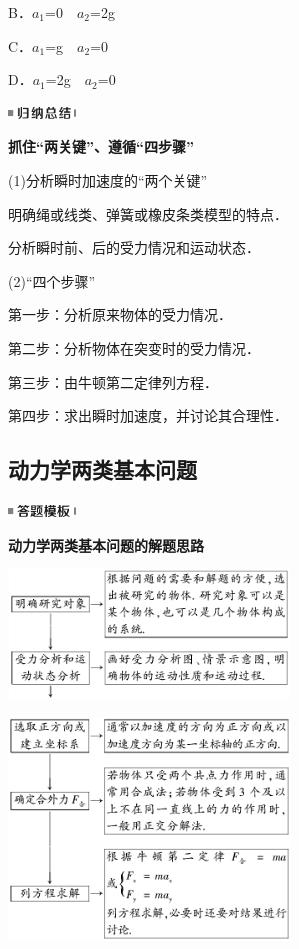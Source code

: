 B．$a_1$=0　$a_2$=2g

C．$a_1$=g　$a_2$=0

D．$a_1$=2g　$a_2$=0



\begin{center}\includegraphics[width=0.70833in,height=0.125in]{media/image13.png}

\textbf{抓住``两关键''、遵循``四步骤''}
\end{center}


(1)分析瞬时加速度的``两个关键''

明确绳或线类、弹簧或橡皮条类模型的特点．

分析瞬时前、后的受力情况和运动状态．

(2)``四个步骤''

第一步：分析原来物体的受力情况．

第二步：分析物体在突变时的受力情况．

第三步：由牛顿第二定律列方程．

第四步：求出瞬时加速度，并讨论其合理性．
\newpage
\subsection{动力学两类基本问题}

\begin{center}\includegraphics[width=0.70833in,height=0.125in]{media/image25.png}

\textbf{动力学两类基本问题的解题思路}
\end{center}


\begin{center}\includegraphics[width=2.94792in,height=1.35417in]{media/image104.png}\end{center}
\begin{center}\includegraphics[width=2.94792in,height=2.32292in]{media/image105.png}\end{center}


